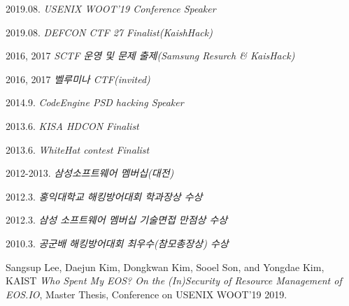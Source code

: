     \begin{activity}
    	\item 2019.08. \textit{USENIX WOOT'19 Conference Speaker}		
        \item 2019.08. \textit{DEFCON CTF 27 Finalist(KaishHack)}
        \item 2016, 2017 \textit{SCTF 운영 및 문제 출제(Samsung Resurch \& KaisHack)}
        \item 2016, 2017 \textit{벨루미나 CTF(invited)}
        \item 2014.9. \textit{CodeEngine PSD hacking Speaker}
        \item 2013.6. \textit{KISA HDCON Finalist}
        \item 2013.6. \textit{WhiteHat contest Finalist}
        \item 2012-2013. \textit{삼성소프트웨어 멤버십(대전)}
        \item 2012.3. \textit{홍익대학교 해킹방어대회 학과장상 수상 }
        \item 2012.3. \textit{삼성 소프트웨어 멤버십 기술면접 만점상 수상}
        \item 2010.3. \textit{공군배 해킹방어대회 최우수(참모총장상) 수상}
    \end{activity}

		\begin{publication}
				\item Sangsup Lee, Daejun Kim, Dongkwan Kim, Sooel Son, and Yongdae Kim, KAIST \textit{Who Spent My EOS? On the (In)Security of Resource Management of EOS.IO}, Master Thesis, Conference on USENIX WOOT'19 2019.
		\end{publication}
